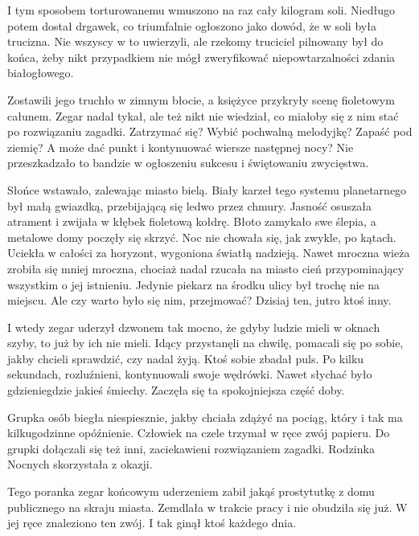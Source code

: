 I tym sposobem torturowanemu wmuszono na raz cały kilogram soli.
Niedługo potem dostał drgawek, co triumfalnie ogłoszono jako dowód, że w soli była trucizna.
Nie wszyscy w to uwierzyli, ale rzekomy truciciel pilnowany był do końca, żeby nikt przypadkiem nie mógł zweryfikować niepowtarzalności zdania białogłowego.

Zostawili jego truchło w zimnym błocie, a księżyce przykryły scenę fioletowym całunem.
Zegar nadal tykał, ale też nikt nie wiedział, co miałoby się z nim stać po rozwiązaniu zagadki.
Zatrzymać się? Wybić pochwalną melodyjkę? Zapaść pod ziemię? A może dać punkt i kontynuować wiersze następnej nocy?
Nie przeszkadzało to bandzie w ogłoszeniu sukcesu i świętowaniu zwycięstwa.

Słońce wstawało, zalewając miasto bielą.
Biały karzeł tego systemu planetarnego był małą gwiazdką, przebijającą się ledwo przez chmury.
Jasność osuszała atrament i zwijała w kłębek fioletową kołdrę.
Błoto zamykało swe ślepia, a metalowe domy poczęły się skrzyć.
Noc nie chowała się, jak zwykle, po kątach. Uciekła w całości za horyzont, wygoniona światłą nadzieją.
Nawet mroczna wieża zrobiła się mniej mroczna, chociaż nadal rzucała na miasto cień przypominający wszystkim o jej istnieniu.
Jedynie piekarz na środku ulicy był trochę nie na miejscu.
Ale czy warto było się nim, przejmować? 
Dzisiaj ten, jutro ktoś inny.

I wtedy zegar uderzył dzwonem tak mocno, że gdyby ludzie mieli w oknach szyby, to już by ich nie mieli.
Idący przystanęli na chwilę, pomacali się po sobie, jakby chcieli sprawdzić, czy nadal żyją.
Ktoś sobie zbadał puls.
Po kilku sekundach, rozluźnieni, kontynuowali swoje wędrówki.
Nawet słychać było gdzieniegdzie jakieś śmiechy.
Zaczęła się ta spokojniejsza część doby.

Grupka osób biegła niespiesznie, jakby chciała zdążyć na pociąg, który i tak ma kilkugodzinne opóźnienie.
Człowiek na czele trzymał w ręce zwój papieru.
Do grupki dołączali się też inni, zaciekawieni rozwiązaniem zagadki.
Rodzinka Nocnych skorzystała z okazji.

Tego poranka zegar końcowym uderzeniem zabił jakąś prostytutkę z domu publicznego na skraju miasta.
Zemdlała w trakcie pracy i nie obudziła się już. W jej ręce znaleziono ten zwój.
I tak ginął ktoś każdego dnia.

